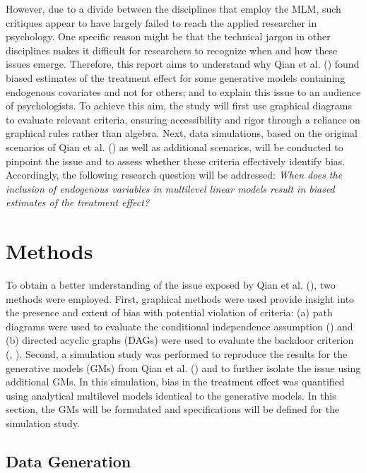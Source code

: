\documentclass[
  11pt,
  a4paper,
]{article}
\begin{document}
However, due to a divide between the disciplines that employ the MLM,
such critiques appear to have largely failed to reach the applied
researcher in psychology. One specific reason might be that the
technical jargon in other disciplines makes it difficult for researchers
to recognize when and how these issues emerge. Therefore, this report
aims to understand why Qian et al. () found
biased estimates of the treatment effect for some generative models
containing endogenous covariates and not for others; and to explain this
issue to an audience of psychologists. To achieve this aim, the study
will first use graphical diagrams to evaluate relevant criteria,
ensuring accessibility and rigor through a reliance on graphical rules
rather than algebra. Next, data simulations, based on the original
scenarios of Qian et al. () as well as
additional scenarios, will be conducted to pinpoint the issue and to
assess whether these criteria effectively identify bias. Accordingly,
the following research question will be addressed: \emph{When does the
inclusion of endogenous variables in multilevel linear models result in
biased estimates of the treatment effect?}

\section{Methods}\label{methods}

To obtain a better understanding of the issue exposed by Qian et al.
(), two methods were employed. First,
graphical methods were used provide insight into the presence and extent
of bias with potential violation of criteria: (a) path diagrams were
used to evaluate the conditional independence assumption
() and (b) directed acyclic
graphs (DAGs) were used to evaluate the backdoor criterion
(, ).
Second, a simulation study was performed to reproduce the results for
the generative models (GMs) from Qian et al.
() and to further isolate the issue using
additional GMs. In this simulation, bias in the treatment effect was
quantified using analytical multilevel models identical to the
generative models. In this section, the GMs will be formulated and
specifications will be defined for the simulation study.

\subsection{Data Generation}\label{data-generation}
\end{document}
